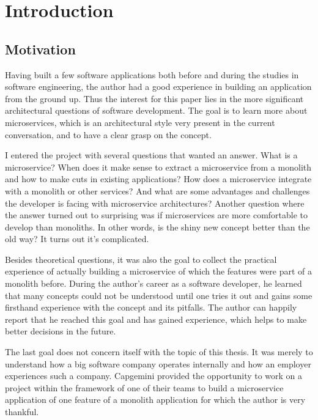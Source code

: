 \chapter{Introduction}
\label{sec:intro}

\section{Motivation}
\label{sec:intro-motivation}

Having built a few software applications both before and during the studies in software engineering, the author had a good experience in building an application from the ground up. Thus the interest for this paper lies in the more significant architectural questions of software development. The goal is to learn more about microservices, which is an architectural style very present in the current conversation, and to have a clear grasp on the concept.

I entered the project with several questions that wanted an answer. What is a microservice? When does it make sense to extract a microservice from a monolith and how to make cuts in existing applications? How does a microservice integrate with a monolith or other services? And what are some advantages and challenges the developer is facing with microservice architectures? Another question where the answer turned out to surprising was if microservices are more comfortable to develop than monoliths. In other words, is the shiny new concept better than the old way? It turns out it's complicated.

Besides theoretical questions, it was also the goal to collect the practical experience of actually building a microservice of which the features were part of a monolith before. During the author's career as a software developer, he learned that many concepts could not be understood until one tries it out and gains some firsthand experience with the concept and its pitfalls. The author can happily report that he reached this goal and has gained experience, which helps to make better decisions in the future.

The last goal does not concern itself with the topic of this thesis. It was merely to understand how a big software company operates internally and how an employer experiences such a company. Capgemini provided the opportunity to work on a project within the framework of one of their teams to build a microservice application of one feature of a monolith application for which the author is very thankful.


